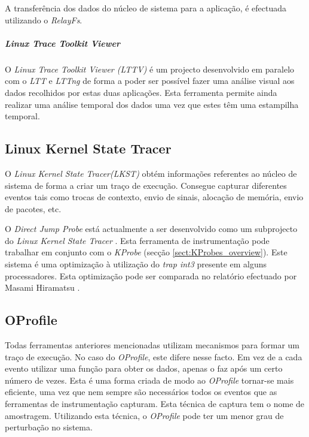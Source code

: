 A transferência dos dados do núcleo de sistema para a aplicação, é efectuada utilizando o \textit{RelayFs}.


\subparagraph{Linux Trace Toolkit Viewer}\label{cap:lttv_overview}
O \textit{Linux Trace Toolkit Viewer (LTTV)} é um projecto desenvolvido em paralelo com o \textit{LTT} e \textit{LTTng} de forma a
 poder ser possível fazer uma análise visual aos dados recolhidos por estas duas aplicações. Esta 
ferramenta permite ainda realizar uma análise temporal dos dados uma vez que estes têm uma estampilha temporal.


\subsection{Linux Kernel State Tracer}

O \textit{Linux Kernel State Tracer(LKST)} obtém informações referentes ao núcleo de sistema de forma a criar um traço de execução. Consegue capturar diferentes eventos tais como trocas de contexto, envio de sinais, alocação de memória, envio de pacotes, etc.

\label{cap:djprobe}
O \textit{Direct Jump Probe} está actualmente a ser desenvolvido como um subprojecto do \textit{Linux Kernel State Tracer} . 
Esta ferramenta de instrumentação pode trabalhar em conjunto com o \textit{KProbe} (secção \ref{sect:KProbes_overview}). 
Este sistema é uma optimização à utilização do \textit{trap int3} presente em alguns processadores. Esta optimização pode ser comparada no relatório efectuado por Masami Hiramatsu \cite{Hiramatsu2005}.
 
\subsection{OProfile}\label{cap:Oprofile_overview}
Todas ferramentas anteriores mencionadas utilizam mecanismos para formar um traço de execução. No caso do \textit{OProfile}, este difere nesse facto. Em vez de a cada evento utilizar uma função para obter os dados, apenas o faz após um certo número de vezes.
Esta é uma forma criada de modo ao \textit{OProfile} tornar-se mais eficiente, uma vez que nem sempre são necessários todos os eventos que as ferramentas de instrumentação capturam. Esta técnica de captura tem o nome de amostragem.
Utilizando esta técnica, o \textit{OProfile} pode ter um menor grau de perturbação no sistema\cite{Will:TuninProgrOProf}.

